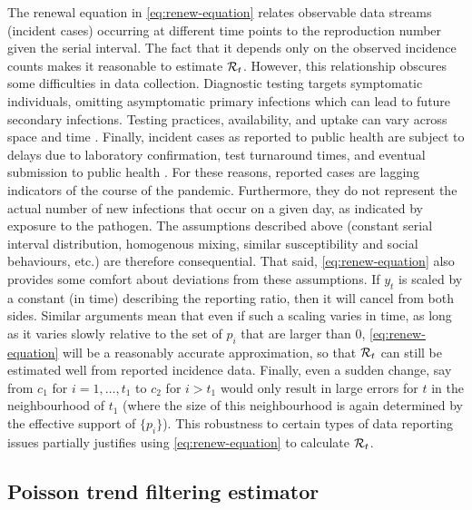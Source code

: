 The renewal equation in \eqref{eq:renew-equation} relates observable data
streams (incident cases) occurring at different time points to the reproduction
number given the serial interval. The fact that it depends only on the observed
incidence counts makes it reasonable to estimate $\mathcal{R}_t$. However, this
relationship obscures some difficulties in data collection. Diagnostic testing
targets symptomatic individuals, omitting asymptomatic primary infections which
can lead to future secondary infections. Testing practices, availability, and
uptake can vary across space and time \citep{pitzer2021impact,
hitchings2021usefulness}. Finally, incident cases as reported to public health
are subject to delays due to laboratory confirmation, test turnaround times, and
eventual submission to public health \citep{pellis2021challenges}. For these
reasons, reported cases are lagging indicators of the course of the pandemic.
Furthermore, they do not represent the actual number of new infections that
occur on a given day, as indicated by exposure to the pathogen. The assumptions
described above (constant serial interval distribution, homogenous mixing,
similar susceptibility and social behaviours, etc.) are therefore consequential.
That said, \eqref{eq:renew-equation} also provides some comfort about deviations
from these assumptions. If $y_t$ is scaled by a constant (in time) describing
the reporting ratio, then it will cancel from both sides. Similar arguments mean
that even if such a scaling varies in time, as long as it varies slowly relative
to the set of $p_i$ that are larger than 0, \eqref{eq:renew-equation} will be a
reasonably accurate approximation, so that $\mathcal{R}_t$ can still be estimated well
from reported incidence data. Finally, even a sudden change, say from $c_1$ for
$i=1,\ldots,t_1$ to $c_2$ for $i>t_1$ would only result in large errors for $t$
in the neighbourhood of $t_1$ (where the size of this neighbourhood is again
determined by the effective support of $\{p_i\}$). This robustness to certain
types of data reporting issues partially justifies using
\eqref{eq:renew-equation} to calculate $\mathcal{R}_t$.

\subsection{Poisson trend filtering estimator} %

